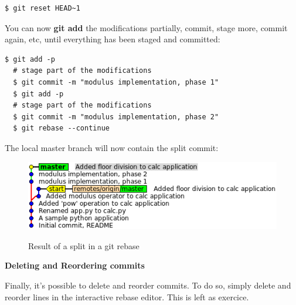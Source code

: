 \documentclass{../../common/tufte-latex/tufte-handout}
\begin{document}
\begin{lstlisting}[style=BashInputStyle]
  $ git reset HEAD~1
\end{lstlisting}

You can now \textbf{git add} the modifications partially, commit, stage more, commit again, etc, until everything has been staged and committed:

\begin{lstlisting}[style=BashInputStyle]
  $ git add -p
  # stage part of the modifications
  $ git commit -m "modulus implementation, phase 1"
  $ git add -p
  # stage part of the modifications
  $ git commit -m "modulus implementation, phase 2"
  $ git rebase --continue
\end{lstlisting}

The local master branch will now contain the split commit:

\begin{figure}%
  \centering
  \includegraphics[width=0.75\linewidth]{gitrebase-split.png}
  \label{fig:gitrebase-split}
  \caption{Result of a split in a git rebase}
\end{figure}

\noindent \textbf{Deleting and Reordering commits}

Finally, it's possible to delete and reorder commits.
To do so, simply delete and reorder lines in the interactive rebase editor.
This is left as exercice.



\end{document}

